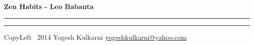 % 


\usepackage{beamerarticle} %



\begin{center}
     \Large{\textbf{Zen Habits - Leo Babauta }}  %
\end{center}
\rule{\linewidth}{0.25pt}
\raggedright
\footnotesize
\begin{multicols}{3}




\rule{0.3\linewidth}{0.25pt}

\scriptsize
CopyLeft \textcopyleft\ 2014 Yogesh Kulkarni
\href{http://www.yogeshkulkarni.com}{yogeshkulkarni@yahoo.com}

\end{multicols}

